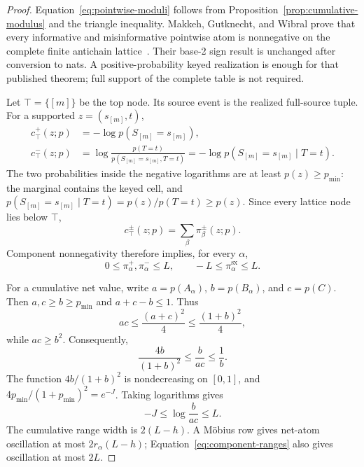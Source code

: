 \documentclass[11pt]{article}
\theoremstyle{definition}
\newcommand{\sx}{\mathrm{sx}}
\begin{document}
\begin{proof}
Equation~\eqref{eq:pointwise-moduli} follows from
Proposition~\ref{prop:cumulative-modulus} and the triangle inequality.  Makkeh, Gutknecht, and
Wibral prove that every informative and misinformative pointwise atom is nonnegative on the
complete finite antichain lattice~\cite[Theorem IV.3 and Appendix A]{makkeh2021}.  Their base-2
sign result is unchanged after conversion to nats.  A positive-probability keyed realization is
enough for that published theorem; full support of the complete table is not required.

Let $\top=\{[m]\}$ be the top node.  Its source event is the realized full-source tuple.  For a
supported $z=(s_{[m]},t)$,
\begin{align}
  c_\top^+(z;p)
    &=-\log p(S_{[m]}=s_{[m]}),\\
  c_\top^-(z;p)
    &=\log\frac{p(T=t)}{p(S_{[m]}=s_{[m]},T=t)}
      =-\log p(S_{[m]}=s_{[m]}\mid T=t).
\end{align}
The two probabilities inside the negative logarithms are at least $p(z)\ge p_{\min}$: the
marginal contains the keyed cell, and
$p(S_{[m]}=s_{[m]}\mid T=t)=p(z)/p(T=t)\ge p(z)$.  Since every lattice node lies below $\top$,
\[
  c_\top^\pm(z;p)=\sum_\beta\pi_\beta^\pm(z;p).
\]
Component nonnegativity therefore implies, for every $\alpha$,
\begin{equation}\label{eq:component-ranges}
  0\le\pi_\alpha^+,\pi_\alpha^-\le L,
  \qquad
  -L\le\pi_\alpha^\sx\le L.
\end{equation}

For a cumulative net value, write $a=p(A_\alpha)$, $b=p(B_\alpha)$, and $c=p(C)$.  Then
	$a,c\ge b\ge p_{\min}$ and $a+c-b\le1$.  Thus
	\begin{equation}
	  ac\le\frac{(a+c)^2}{4}\le\frac{(1+b)^2}{4},
	\end{equation}
	while $ac\ge b^2$.  Consequently,
	\begin{equation}
	  \frac{4b}{(1+b)^2}
	  \le
	  \frac{b}{ac}
	  \le
	  \frac1b.
	\end{equation}
	The function $4b/(1+b)^2$ is nondecreasing on $[0,1]$, and
	$4p_{\min}/(1+p_{\min})^2=e^{-J}$.  Taking logarithms gives
	\begin{equation}\label{eq:cumulative-range}
	  -J
  \le
  \log\frac{b}{ac}
  \le L.
\end{equation}
The cumulative range width is $2(L-h)$.  A M{\"o}bius row gives net-atom oscillation at most
$2r_\alpha(L-h)$; Equation~\eqref{eq:component-ranges} also gives oscillation at most $2L$.


\end{proof}
\end{document}
